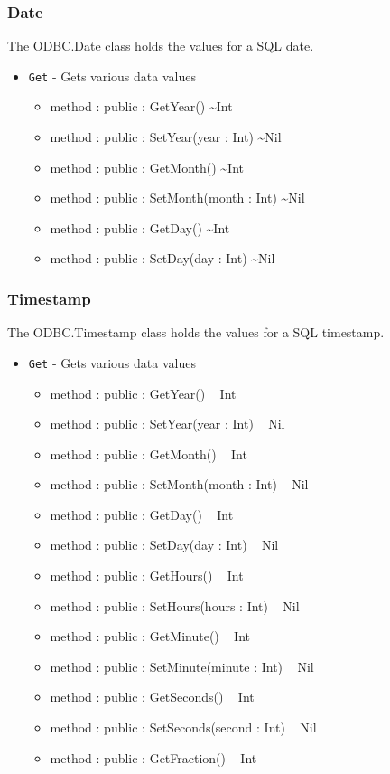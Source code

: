 \documentclass[11pt]{article}
\begin{document}
\subsubsection{Date}
The ODBC.Date class holds the values for a SQL date.

\begin{itemize}
\item \texttt{Get} - Gets various data values
  \begin{itemize}
  \item method : public : GetYear() \textasciitilde Int
  \item method : public : SetYear(year : Int) \textasciitilde Nil
  \item method : public : GetMonth() \textasciitilde Int
  \item method : public : SetMonth(month : Int) \textasciitilde Nil
  \item method : public : GetDay() \textasciitilde Int
  \item method : public : SetDay(day : Int) \textasciitilde Nil
  \end{itemize}
\end{itemize}

\subsubsection{Timestamp}
The ODBC.Timestamp class holds the values for a SQL timestamp.

\begin{itemize}
\item \texttt{Get} - Gets various data values
  \begin{itemize}
  \item method : public : GetYear() ~ Int 
  \item method : public : SetYear(year : Int) ~ Nil 
  \item method : public : GetMonth() ~ Int 
  \item method : public : SetMonth(month : Int) ~ Nil 
  \item method : public : GetDay() ~ Int 
  \item method : public : SetDay(day : Int) ~ Nil 
  \item method : public : GetHours() ~ Int 
  \item method : public : SetHours(hours : Int) ~ Nil 
  \item method : public : GetMinute() ~ Int 
  \item method : public : SetMinute(minute : Int) ~ Nil 
  \item method : public : GetSeconds() ~ Int 
  \item method : public : SetSeconds(second : Int) ~ Nil 
  \item method : public : GetFraction() ~ Int 
  \end{itemize}
\end{itemize}
\end{document}
